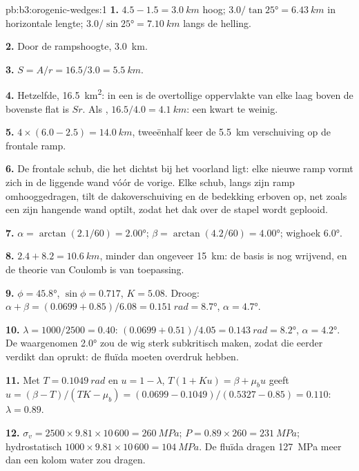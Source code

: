 \begin{solution}{pb:b3:orogenic-wedges:1}
\textbf{1.} $4.5 - 1.5 = \qty{3.0}{km}$ hoog; $3.0/\tan\ang{25} =
\qty{6.43}{km}$ in horizontale lengte; $3.0/\sin\ang{25} = \qty{7.10}{km}$ langs
de helling.

\textbf{2.} Door de rampshoogte, \qty{3.0}{km}.

\textbf{3.} $S = A/r = 16.5/3.0 = \qty{5.5}{km}$.

\textbf{4.} Hetzelfde, \qty{16.5}{km^2}: in een  is de overtollige oppervlakte
van elke laag boven de bovenste flat is $Sr$. Als , $16.5/4.0 =
\qty{4.1}{km}$: een kwart te weinig.

\textbf{5.} $4\times(6.0 - 2.5) = \qty{14.0}{km}$, tweeënhalf keer de
\qty{5.5}{km} verschuiving op de frontale ramp.

\textbf{6.} De frontale schub, die het dichtst bij het voorland ligt: elke nieuwe ramp
vormt zich in de liggende wand vóór de vorige. Elke schub, langs zijn ramp omhooggedragen,
tilt de dakoverschuiving en de bedekking erboven op, net zoals een 
zijn hangende wand optilt, zodat het dak over de stapel wordt geplooid.

\textbf{7.} $\alpha = \arctan(2.1/60) = \ang{2.00}$; $\beta =
\arctan(4.2/60) = \ang{4.00}$; wighoek \ang{6.0}.

\textbf{8.} $2.4 + 8.2 = \qty{10.6}{km}$, minder dan ongeveer \qty{15}{km}: de
basis is nog wrijvend, en de theorie van Coulomb is van toepassing.

\textbf{9.} $\phi = \ang{45.8}$, $\sin\phi = 0.717$, $K = 5.08$. Droog:
$\alpha + \beta = (0.0699 + 0.85)/6.08 = \qty{0.151}{rad} = \ang{8.7}$,
$\alpha = \ang{4.7}$.

\textbf{10.} $\lambda = 1000/2500 = 0.40$: $(0.0699 + 0.51)/4.05 =
\qty{0.143}{rad} = \ang{8.2}$, $\alpha = \ang{4.2}$. De waargenomen \ang{2.0}
zou de wig sterk subkritisch maken, zodat die eerder verdikt dan oprukt:
de fluïda moeten overdruk hebben.

\textbf{11.} Met $T = \qty{0.1049}{rad}$ en $u = 1 - \lambda$, $T(1 + Ku) =
\beta + \mu_bu$ geeft $u = (\beta - T)/(TK - \mu_b) = (0.0699 -
0.1049)/(0.5327 - 0.85) = 0.110$: $\lambda = 0.89$.

\textbf{12.} $\sigma_v = 2500\times9.81\times10\,600 = \qty{260}{MPa}$; $P =
0.89\times260 = \qty{231}{MPa}$; hydrostatisch $1000\times9.81\times10\,600 =
\qty{104}{MPa}$. De fluïda dragen \qty{127}{MPa} meer dan een kolom
water zou dragen.


\end{solution}
